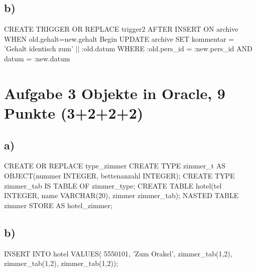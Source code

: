 \documentclass[12pt]{scrreprt}
\begin{document}
\subsection*{b)}
CREATE TRIGGER OR REPLACE trigger2\newline
\hspace*{5mm}AFTER INSERT ON archive\newline
\hspace*{5mm}WHEN old.gehalt=new.gehalt\newline
Begin\newline
\hspace*{5mm}UPDATE archive SET kommentar = 'Gehalt identisch zum' $||$ :old.datum\newline
\hspace*{5mm}WHERE :old.pers\_id = :new.pers\_id AND\newline
\hspace*{5mm}datum = :new.datum\newline

\section*{Aufgabe 3 Objekte in Oracle, 9 Punkte (3+2+2+2)}
\subsection*{a)}
CREATE OR REPLACE type\_zimmer\newline
CREATE TYPE zimmer\_t AS OBJECT(nummer INTEGER, bettenanzahl INTEGER);\newline
CREATE TYPE zimmer\_tab IS TABLE OF zimmer\_type;\newline
CREATE TABLE hotel(tel INTEGER, name VARCHAR(20), zimmer zimmer\_tab);\newline
NASTED TABLE zimmer STORE AS hotel\_zimmer;\newline
\subsection*{b)}
INSERT INTO hotel VALUES(\newline
\hspace*{5mm}5550101, 'Zum Orakel',\newline
\hspace*{5mm}zimmer\_tab(1,2),\newline
\hspace*{5mm}zimmer\_tab(1,2),\newline
\hspace*{5mm}zimmer\_tab(1,2));\newline
\end{document}
